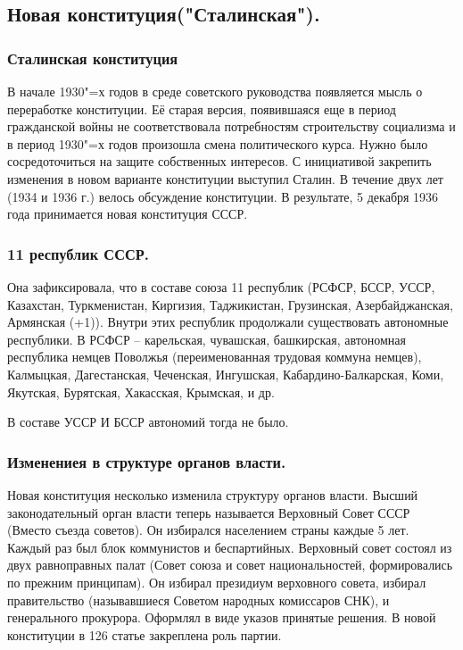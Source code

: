 \subsection{Новая конституция("Сталинская").}

\subsubsection{\textbf{Сталинская конституция}}
В начале 1930"=х годов в среде советского руководства появляется мысль о переработке конституции. Её старая версия, появившаяся еще в период гражданской войны не соответствовала потребностям строительству социализма и в период 1930"=х годов произошла смена политического курса. Нужно было сосредоточиться на защите собственных интересов. С инициативой закрепить изменения в новом варианте конституции выступил Сталин. В течение двух лет (1934 и 1936 г.) велось обсуждение конституции. В результате, 5 декабря 1936 года принимается новая конституция СССР. 

\subsubsection{\textbf{11 республик СССР.}}
Она зафиксировала, что в составе союза 11 республик (РСФСР, БССР, УССР, Казахстан, Туркменистан, Киргизия, Таджикистан, Грузинская, Азербайджанская, Армянская (+1)). Внутри этих республик продолжали существовать автономные республики. В РСФСР – карельская, чувашская, башкирская, автономная республика немцев Поволжья (переименованная трудовая коммуна немцев), Калмыцкая, Дагестанская, Чеченская, Ингушская, Кабардино-Балкарская, Коми, Якутская, Бурятская, Хакасская, Крымская, и др.

В составе УССР И БССР автономий тогда не было.

\subsubsection{\textbf{Изменениея в структуре органов власти.}}

Новая конституция несколько изменила структуру органов власти. Высший законодательный орган власти теперь называется Верховный Совет СССР (Вместо съезда советов). Он избирался населением страны каждые 5 лет. Каждый раз был блок коммунистов и беспартийных. Верховный совет состоял из двух равноправных палат (Совет союза и совет национальностей, формировались по прежним принципам). Он избирал президиум верховного совета, избирал правительство (называвшиеся Советом народных комиссаров СНК), и генерального прокурора. Оформлял в виде указов принятые решения.
В новой конституции в 126 статье закреплена роль партии. 

